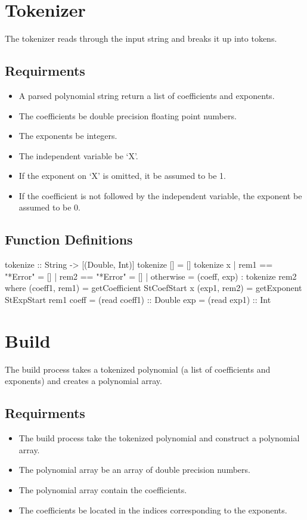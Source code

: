 \section{Tokenizer}
The tokenizer reads through the input string and breaks it up into tokens.
\subsection{Requirments}
\begin{itemize}
\item A parsed polynomial string  return a list of coefficients and exponents.
\item The coefficients  be double precision floating point numbers.
\item The exponents  be integers.
\item The independent variable  be `X'.
\item If the exponent on `X' is omitted, it  be assumed to be 1.
\item If the coefficient is not followed by the independent variable, the exponent  be assumed to be 0.
\end{itemize}

\subsection{Function Definitions}
\begin{code}
tokenize :: String -> [(Double, Int)]
tokenize [] = []
tokenize x
  | rem1 == "*Error" = []
  | rem2 == "*Error" = []
  | otherwise        = (coeff, exp) : tokenize rem2
  where
  (coeff1, rem1) = getCoefficient StCoefStart x
  (exp1, rem2) = getExponent StExpStart rem1
  coeff = (read coeff1) :: Double
  exp = (read exp1) :: Int
\end{code}

\section{Build}
The build process takes a tokenized polynomial (a list of coefficients and exponents) and creates a polynomial array.
\subsection{Requirments}
\begin{itemize}
\item The build process  take the tokenized polynomial and construct a polynomial array.
\item The polynomial array  be an array of double precision numbers.
\item The polynomial array  contain the coefficients.
\item The coefficients  be located in the indices corresponding to the exponents.
\end{itemize}


